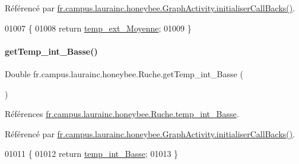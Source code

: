 Référencé par \hyperlink{classfr_1_1campus_1_1laurainc_1_1honeybee_1_1_graph_activity_a8dc56c3e0744bcb9295ad10e726b5fdb}{fr.\+campus.\+laurainc.\+honeybee.\+Graph\+Activity.\+initialiser\+Call\+Backs()}.


\begin{DoxyCode}
01007                                         \{
01008         \textcolor{keywordflow}{return} \hyperlink{classfr_1_1campus_1_1laurainc_1_1honeybee_1_1_ruche_a254c5bb0927e07aebb85c811560eff98}{temp\_ext\_Moyenne};
01009     \}
\end{DoxyCode}
\mbox{\label{classfr_1_1campus_1_1laurainc_1_1honeybee_1_1_ruche_a32d803ef9eae5d0de4f03a60195ef84d}} 
\paragraph{\texorpdfstring{get\+Temp\+\_\+int\+\_\+\+Basse()}{getTemp\_int\_Basse()}}
{\footnotesize\ttfamily Double fr.\+campus.\+laurainc.\+honeybee.\+Ruche.\+get\+Temp\+\_\+int\+\_\+\+Basse (\begin{DoxyParamCaption}{ }\end{DoxyParamCaption})}



Références \hyperlink{classfr_1_1campus_1_1laurainc_1_1honeybee_1_1_ruche_a09b3b4f5f23736064df7d6dd245d1210}{fr.\+campus.\+laurainc.\+honeybee.\+Ruche.\+temp\+\_\+int\+\_\+\+Basse}.



Référencé par \hyperlink{classfr_1_1campus_1_1laurainc_1_1honeybee_1_1_graph_activity_a8dc56c3e0744bcb9295ad10e726b5fdb}{fr.\+campus.\+laurainc.\+honeybee.\+Graph\+Activity.\+initialiser\+Call\+Backs()}.


\begin{DoxyCode}
01011                                       \{
01012         \textcolor{keywordflow}{return} \hyperlink{classfr_1_1campus_1_1laurainc_1_1honeybee_1_1_ruche_a09b3b4f5f23736064df7d6dd245d1210}{temp\_int\_Basse};
01013     \}
\end{DoxyCode}
\mbox{\label{classfr_1_1campus_1_1laurainc_1_1honeybee_1_1_ruche_ab3abf832ec17a57a632d0c712902d282}} 
